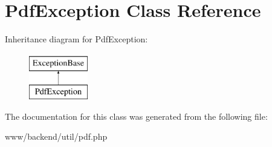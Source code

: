 \hypertarget{classPdfException}{
\section{PdfException Class Reference}
\label{classPdfException}
}
Inheritance diagram for PdfException:\begin{figure}[H]
\begin{center}
\leavevmode
\includegraphics[height=2.000000cm]{classPdfException}
\end{center}
\end{figure}


The documentation for this class was generated from the following file:\begin{DoxyCompactItemize}
\item 
www/backend/util/pdf.php\end{DoxyCompactItemize}

